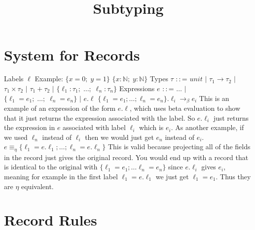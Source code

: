 \documentclass{lecturenotes}
\title{Subtyping}
\begin{document}
\maketitle

\section{System for Records}
Labels $\ell$ \newline
Example: $\{x=0; \; y=1\}$ $\{x:\mathbb{N}; \; y:\mathbb{N}\}$ \newline \newline
Types $\tau$ $\mathrel{::}$= $unit$ $\vert$ $\tau_1 \rightarrow \tau_2$ $\vert$
$\tau_1 \times \tau_2$ $\vert$ $\tau_1 + \tau_2$ $\vert$ 
$\{ \ell_1 : \tau_1 ; \; \dots ; \; \ell_n : \tau_n \}$ \newline \newline
Expressions $e$ $\mathrel{::}$= $\dots$ $\vert$ $\{\ell_1 = e_1; \; \dots ; \; \ell_n = e_n \}$ 
$\vert$ $e.\ell$ \newline \newline
$\{ \ell_1 = e_1 ; \dots ; \ell_n = e_n \} .\ell_i \rightarrow_\beta e_i$ \newline 
This is an example of an expression of the form $e.\ell$, which uses beta evaluation to show that it just returns the expression associated with the label.
So $e.\ell_i$ just returns the expression in $e$ associated with label $\ell_i$ which is $e_i$.
As another example, if we used $\ell_n$ instead of $\ell_i$ then we would just get $e_n$ instead of $e_i$. \newline \newline
$e \equiv_\eta \{ \ell_1 = e.\ell_1; \dots ; \ell_n = e.\ell_n \}$ \newline
This is valid because projecting all of the fields in the record just gives the original record.
You would end up with a record that is identical to the original with $\{ \ell_1 = e_1; \dots \ell_n = e_n \}$ since $e.\ell_i$ gives $e_i$,
meaning for example in the first label $\ell_1 = e.\ell_1$ we just get $\ell_1 = e_1$. Thus they are $\eta$ equivalent. \newline

\section{Record Rules}

\begin{mathpar}
\end{mathpar}
\end{document}
